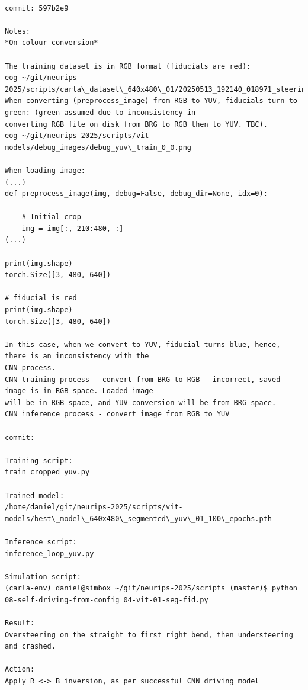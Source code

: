 \begin{verbatim}

commit: 597b2e9

Notes:
*On colour conversion*

The training dataset is in RGB format (fiducials are red):
eog ~/git/neurips-2025/scripts/carla\_dataset\_640x480\_01/20250513_192140_018971_steering_0.0000.jpg
When converting (preprocess_image) from RGB to YUV, fiducials turn to green: (green assumed due to inconsistency in
converting RGB file on disk from BRG to RGB then to YUV. TBC).
eog ~/git/neurips-2025/scripts/vit-models/debug_images/debug_yuv\_train_0_0.png

When loading image:
(...)
def preprocess_image(img, debug=False, debug_dir=None, idx=0):

    # Initial crop
    img = img[:, 210:480, :]
(...)

print(img.shape)
torch.Size([3, 480, 640])

# fiducial is red
print(img.shape)
torch.Size([3, 480, 640])

In this case, when we convert to YUV, fiducial turns blue, hence, there is an inconsistency with the
CNN process. 
CNN training process - convert from BRG to RGB - incorrect, saved image is in RGB space. Loaded image
will be in RGB space, and YUV conversion will be from BRG space.
CNN inference process - convert image from RGB to YUV

commit: 

Training script:
train_cropped_yuv.py

Trained model:
/home/daniel/git/neurips-2025/scripts/vit-models/best\_model\_640x480\_segmented\_yuv\_01_100\_epochs.pth

Inference script:
inference_loop_yuv.py

Simulation script:
(carla-env) daniel@simbox ~/git/neurips-2025/scripts (master)$ python 08-self-driving-from-config_04-vit-01-seg-fid.py 

Result:
Oversteering on the straight to first right bend, then understeering and crashed.

Action:
Apply R <-> B inversion, as per successful CNN driving model

\end{verbatim}

